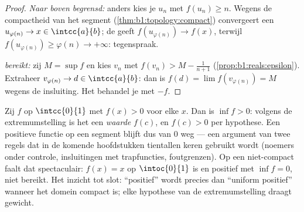 \begin{proof}
\emph{Naar boven begrensd:} anders kies je $u_n$ met $f(u_n) \geq n$.
Wegens de compactheid van het segment (\cref{thm:b1:topology:compact})
convergeert een  $u_{\varphi(n)} \to x \in \intcc{a}{b}$; de
 geeft $f(u_{\varphi(n)}) \to f(x)$, terwijl
$f(u_{\varphi(n)}) \geq \varphi(n) \to +\infty$: tegenspraak.

\emph{ bereikt:} zij $M = \sup f$ en kies $v_n$ met $f(v_n) > M -
\frac{1}{n+1}$ (\cref{prop:b1:reals:epsilon}). Extraheer $v_{\varphi(n)}
\to d \in \intcc{a}{b}$: dan is $f(d) = \lim f(v_{\varphi(n)}) = M$
wegens de insluiting. Het  behandel je met $-f$.
\end{proof}

\begin{example}\label{ex:b1:continuity:posmin}
Zij $f$  op $\intcc{0}{1}$ met $f(x) > 0$ voor elke $x$. Dan is
$\inf f > 0$: volgens de extremumstelling is het  een
\emph{waarde} $f(c)$, en $f(c) > 0$ per hypothese. Een  positieve
functie op een segment blijft dus van $0$ weg --- een argument van twee
regels dat in de komende hoofdstukken tientallen keren gebruikt wordt
(noemers onder controle, insluitingen met trapfuncties, foutgrenzen). Op
een niet-compact  faalt dat spectaculair: $f(x) = x$ op
$\intoc{0}{1}$ is  en positief met $\inf f = 0$, niet bereikt. Het
inzicht tot slot: ``positief'' wordt precies dan ``uniform positief''
wanneer het domein compact is; elke hypothese van de extremumstelling
draagt gewicht.
\end{example}

